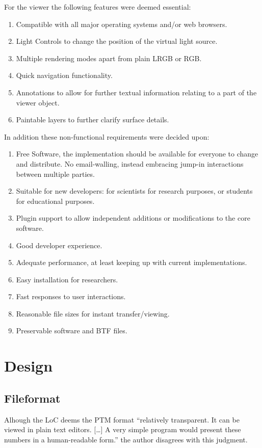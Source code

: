 For the viewer the following features were deemed essential:
\begin{enumerate}[resume]
\item Compatible with all major operating systems and/or web browsers.\label{req_system}
\item Light Controls to change the position of the virtual light source.
\item Multiple rendering modes apart from plain LRGB or RGB.
\item Quick navigation functionality.
\item Annotations to allow for further textual information relating to a part of
  the viewer object.
\item Paintable layers to further clarify surface details.
\end{enumerate}

In addition these non-functional requirements were decided upon:
\begin{enumerate}[resume]
\item  Free Software, the implementation should be available for everyone to
  change and distribute. No email-walling, instead embracing jump-in
  interactions between multiple parties. \label{req_os}
\item Suitable for new developers: for scientists for research purposes,
  or students for educational purposes. \label{req_easy}
\item Plugin support to allow independent additions or modifications to the core software.
\item Good developer experience. \label{req_dx}
\item Adequate performance, at least keeping up with current
  implementations. \label{req_performance}
\item Easy installation for
  researchers. \label{req_install}
\item Fast responses to user interactions. \label{req_react}
\item Reasonable file sizes for instant transfer/viewing.
\item Preservable software and BTF files.\label{req_preserve}
\end{enumerate}

\section{Design}

\subsection{Fileformat}
Alhough the LoC deems the PTM format ``relatively transparent. It can be viewed
in plain text editors. [\ldots] A very simple program would present these
numbers in a human-readable
form.''\cite*{library_of_congress_polynomial_2018} the author disagrees with
this judgment.

